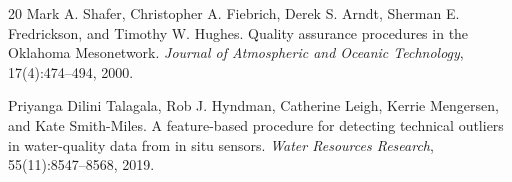 \begin{thebibliography}{20}
Mark A. Shafer, Christopher A. Fiebrich, Derek S. Arndt, Sherman E. Fredrickson, and Timothy W. Hughes.
\newblock Quality assurance procedures in the Oklahoma Mesonetwork.
\newblock \emph{Journal of Atmospheric and Oceanic Technology}, 17(4):474--494, 2000.

Priyanga Dilini Talagala, Rob J. Hyndman, Catherine Leigh, Kerrie Mengersen, and Kate Smith-Miles.
\newblock A feature-based procedure for detecting technical outliers in water-quality data from in situ sensors.
\newblock \emph{Water Resources Research}, 55(11):8547--8568, 2019.

\end{thebibliography}
